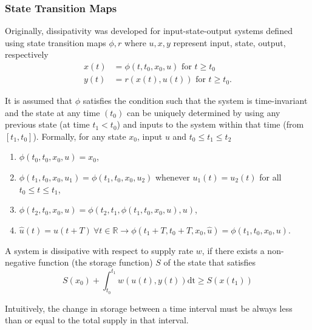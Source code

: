 \subsubsection{State Transition Maps}
Originally, dissipativity was developed for input-state-output systems defined using state transition maps $\phi, r$ where $u,x,y$ represent input, state, output, respectively
\begin{align}
\label{eq:xstf}
x(t) &= \phi(t,t_0,x_0,u) \text{ for } t \geq t_0\\
\label{eq:yrof}
y(t) &= r(x(t),u(t)) \text{ for } t \geq t_0.
\end{align}
\begin{assumption}[\cite{9781279}]
It is assumed that $\phi$ satisfies the condition such that the system is time-invariant and the state at any time $(t_0)$ can be uniquely determined by using any previous state (at time $t_1<t_0$) and inputs to the system within that time (from $[t_1,t_0]$).
Formally, for any state $x_0$, input $u$ and $t_0\leq t_1\leq t_2$
\begin{enumerate}
\item $\phi(t_0, t_0, x_0, u) = x_0$, %
\item $\phi(t_1, t_0, x_0, u_1) = \phi(t_1, t_0, x_0, u_2)$ whenever $u_1(t) = u_2(t)$ for all $t_0 \leq t \leq t_1$, %
\item $\phi(t_2, t_0, x_0, u) = \phi(t_2, t_1, \phi(t_1, t_0, x_0, u), u)$, %
\item $\hat{u}(t) = u(t+T)\ \forall t\in\mathbb{R}\rightarrow\phi(t_1+T,t_0+T,x_0,\hat{u})=\phi(t_1,t_0,x_0,u)$.%
\end{enumerate}
\end{assumption}
\begin{definition}
A system is dissipative with respect to supply rate $w$, if there exists a non-negative function (the storage function) $S$ of the state that satisfies
\begin{equation}
\label{eq:di}
S(x_0) + \int_{t_0}^{t_1}w(u(t),y(t))\mathrm{dt} \geq S(x(t_1))
\end{equation}
\end{definition}
Intuitively, the change in storage between a time interval must be always less than or equal to the total supply in that interval.
